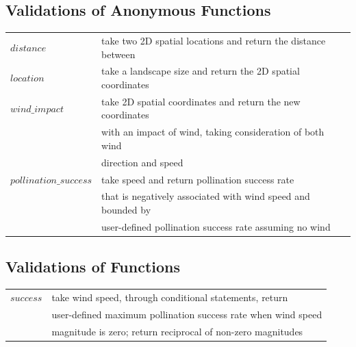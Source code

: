 \documentclass[3p,,preprint,12pt]{elsarticle}
\begin{document}
\subsection{\textbf{Validations of Anonymous Functions}}
\begin{table}[!htb]
\begin{tabular}{ l l }
 $distance$ & take two 2D spatial locations and return the distance between\\
 $location$ & take a landscape size and return the 2D spatial coordinates\\ 
 $wind\_impact$ & take 2D spatial coordinates and return the new coordinates\\
 & with an impact of wind, taking consideration of both wind \\
 & direction and speed\\
 $pollination\_success$ & take speed and return pollination success rate \\
 & that is negatively associated with wind speed and bounded by \\
 & user-defined pollination success rate assuming no wind
\end{tabular}
\end{table}

\subsection{\textbf{Validations of Functions}}
\begin{table}[!htb]
\begin{tabular}{ l l }
 $success$ & take wind speed, through conditional statements, return \\
 & user-defined maximum pollination success rate when wind speed \\
 & magnitude is zero; return reciprocal of non-zero magnitudes \\
\end{tabular}
\end{table}
\pagebreak
\end{document}
